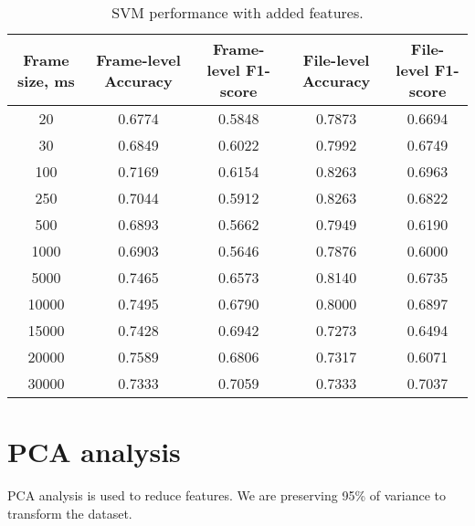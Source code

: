 \documentclass[conference]{IEEEtran}
\begin{document}

\begin{table}[h]
\centering
\caption{SVM performance with added features.}
\begin{tabular}{|c|c|c|c|c|}
\hline
\textbf{Frame size, ms} & \textbf{Frame-level Accuracy} & \textbf{Frame-level F1-score} & \textbf{File-level Accuracy} & \textbf{File-level F1-score} \\
\hline
20 & 0.6774 & 0.5848 & 0.7873 & 0.6694 \\
\hline
30 & 0.6849 & 0.6022 & 0.7992 & 0.6749 \\
\hline
100 & 0.7169 & 0.6154 & 0.8263 & 0.6963 \\
\hline
250 & 0.7044 & 0.5912 & 0.8263 & 0.6822 \\
\hline
500 & 0.6893 & 0.5662 & 0.7949 & 0.6190 \\
\hline
1000 & 0.6903 & 0.5646 & 0.7876 & 0.6000 \\
\hline
5000 & 0.7465 & 0.6573 & 0.8140 & 0.6735 \\
\hline
10000 & 0.7495 & 0.6790 & 0.8000 & 0.6897 \\
\hline
15000 & 0.7428 & 0.6942 & 0.7273 & 0.6494 \\
\hline
20000 & 0.7589 & 0.6806 & 0.7317 & 0.6071 \\
\hline
30000 & 0.7333 & 0.7059 & 0.7333 & 0.7037 \\
\hline
\end{tabular}
\label{tab:svm_added_feat_perf}
\end{table}

\section{PCA analysis}

PCA analysis is used to reduce features. 
We are preserving 95\% of variance to transform the dataset.


\end{document}
